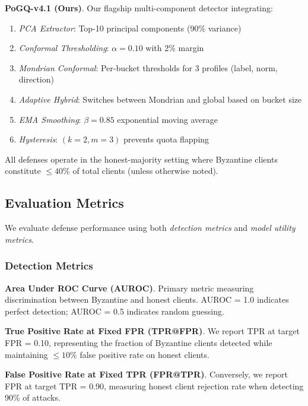 \textbf{PoGQ-v4.1 (Ours)}. Our flagship multi-component detector integrating:
\begin{enumerate}[leftmargin=*,noitemsep]
    \item \textit{PCA Extractor}: Top-10 principal components (90\% variance)
    \item \textit{Conformal Thresholding}: $\alpha = 0.10$ with 2\% margin
    \item \textit{Mondrian Conformal}: Per-bucket thresholds for 3 profiles (label, norm, direction)
    \item \textit{Adaptive Hybrid}: Switches between Mondrian and global based on bucket size
    \item \textit{EMA Smoothing}: $\beta = 0.85$ exponential moving average
    \item \textit{Hysteresis}: $(k=2, m=3)$ prevents quota flapping
\end{enumerate}

All defenses operate in the honest-majority setting where Byzantine clients constitute $\leq 40\%$ of total clients (unless otherwise noted).


\subsection{Evaluation Metrics}
\label{sec:metrics}

We evaluate defense performance using both \textit{detection metrics} and \textit{model utility metrics}.

\subsubsection{Detection Metrics}

\textbf{Area Under ROC Curve (AUROC)}. Primary metric measuring discrimination between Byzantine and honest clients. AUROC = 1.0 indicates perfect detection; AUROC = 0.5 indicates random guessing.

\textbf{True Positive Rate at Fixed FPR (TPR@FPR)}. We report TPR at target FPR = 0.10, representing the fraction of Byzantine clients detected while maintaining $\leq 10\%$ false positive rate on honest clients.

\textbf{False Positive Rate at Fixed TPR (FPR@TPR)}. Conversely, we report FPR at target TPR = 0.90, measuring honest client rejection rate when detecting 90\% of attacks.

